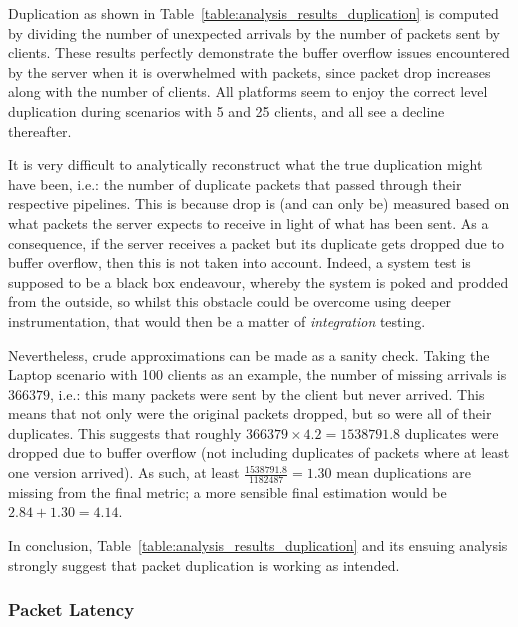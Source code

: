 Duplication as shown in Table~\ref{table:analysis_results_duplication} is computed by dividing the number of
unexpected arrivals by the number of packets sent by clients. These results perfectly demonstrate the buffer overflow
issues encountered by the server when it is overwhelmed with packets, since packet drop increases along with the
number of clients. All platforms seem to enjoy the correct level duplication during scenarios with 5 and 25 clients,
and all see a decline thereafter.

It is very difficult to analytically reconstruct what the true duplication might have been, i.e.: the number of
duplicate packets that passed through their respective pipelines. This is because drop is (and can only be)
measured based on what packets the server expects to receive in light of what has been sent. As a consequence, if the
server receives a packet but its duplicate gets dropped due to buffer overflow, then this is not taken into account.
Indeed, a system test is supposed to be a black box endeavour, whereby the system is poked and prodded from the
outside, so whilst this obstacle could be overcome using deeper instrumentation, that would then be a matter of
\emph{integration} testing\cite{integration_vs_system_testing}.

Nevertheless, crude approximations can be made as a sanity check. Taking the Laptop scenario with 100 clients as an
example, the number of missing arrivals is $366379$, i.e.: this many packets were sent by the client but never
arrived. This means that not only were the original packets dropped, but so were all of their duplicates. This
suggests that roughly $366379 \times 4.2 = 1538791.8$ duplicates were dropped due to buffer overflow (not including
duplicates of packets where at least one version arrived). As such, at least $\frac{1538791.8}{1182487} = 1.30$ mean
duplications are missing from the final metric; a more sensible final estimation would be $2.84 + 1.30 = 4.14$.

In conclusion, Table~\ref{table:analysis_results_duplication} and its ensuing analysis strongly suggest that packet
duplication is working as intended.

\subsubsection{Packet Latency}\label{subsubsection:latency_analysis}

